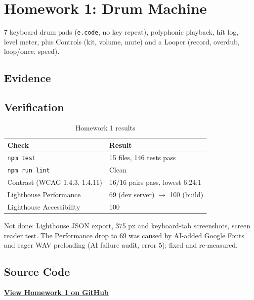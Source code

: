 \chapter{Homework 1: Drum Machine}
\label{chap:hw1}

7 keyboard drum pads (\texttt{e.code}, no key repeat), polyphonic playback, hit log, level meter, plus Controls (kit, volume, mute) and a Looper (record, overdub, loop/once, speed).

\section{Evidence}


\section{Verification}

\begin{table}[H]
\centering
\begin{tabular}{L{5.5cm} L{7.5cm}}
\toprule
\textbf{Check} & \textbf{Result} \\
\midrule
\texttt{npm test} & 15 files, 146 tests pass \\
\texttt{npm run lint} & Clean \\
Contrast (WCAG 1.4.3, 1.4.11) & 16/16 pairs pass, lowest 6.24:1 \\
Lighthouse Performance & 69 (dev server) $\rightarrow$ 100 (build) \\
Lighthouse Accessibility & 100 \\
\bottomrule
\end{tabular}
\caption{Homework 1 results}
\label{tab:hw1-verify}
\end{table}

Not done: Lighthouse JSON export, 375 px and keyboard-tab screenshots, screen reader test. The Performance drop to 69 was caused by AI-added Google Fonts and eager WAV preloading (AI failure audit, error 5); fixed and re-measured.

\section{Source Code}

\begin{center}
    \href{https://github.com/Prosperum26/24520626_QuangPhuHung_MSIS207_Lab03/tree/main/src/homeworks/DrumMachine}
    {\textbf{View Homework 1 on GitHub}}
\end{center}
